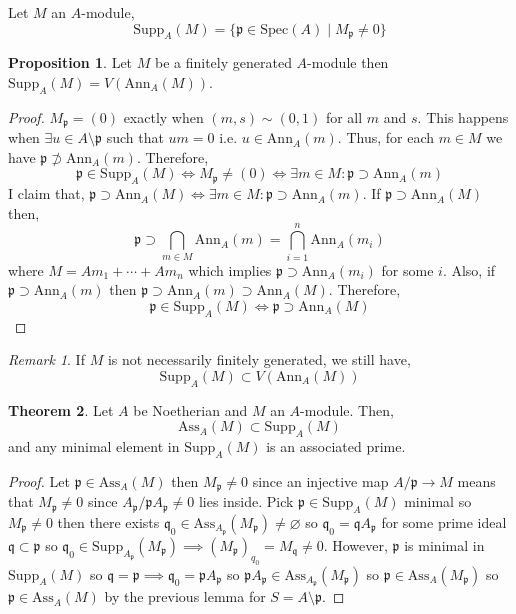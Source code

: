 \documentclass[12pt]{article}
\newcommand{\Ann}[2]{\mathrm{Ann}_{#1}\left(#2\right)}
\newcommand{\Ass}[2]{\mathrm{Ass}_{#1}\left( #2 \right)}
\newcommand{\supp}[2]{\mathrm{Supp}_{#1} \left( #2 \right) }
\newcommand{\Supp}[2]{\mathrm{Supp}_{#1}\left(#2 \right)}
\newcommand{\spec}[1]{\mathrm{Spec}\left( #1 \right)}
\newcommand{\p}{\mathfrak{p}}
\newcommand{\q}{\mathfrak{q}}
\theoremstyle{remark}
\newtheorem*{remark}{Remark}
\theoremstyle{definition}
\newtheorem{theorem}{Theorem}[section]
\newtheorem{proposition}[theorem]{Proposition}
\newenvironment{definition}[1][Definition:]{\begin{trivlist}
\item[\hskip \labelsep {\bfseries #1}]}{\end{trivlist}}
\begin{document}
\begin{definition}
Let $M$ an $A$-module,
\[ \supp{A}{M} = \{ \p \in \spec{A} \mid M_{\p} \neq 0 \} \]
\end{definition}

\begin{proposition}
Let $M$ be a finitely generated $A$-module then
$\Supp{A}{M} = V(\Ann{A}{M})$.
\end{proposition}

\begin{proof}
$M_\p = (0)$ exactly when $(m, s) \sim (0, 1)$ for all $m$ and $s$. This happens when $\exists u \in A \setminus \p$ such that $um = 0$ i.e. $u \in \Ann{A}{m}$. Thus, for each $m \in M$ we have $\p \not\supset \Ann{A}{m}$. Therefore, 
\[ \p \in \Supp{A}{M} \iff M_\p \neq (0) \iff \exists m \in M : \p \supset \Ann{A}{m} \]
I claim that, $\p \supset \Ann{A}{M} \iff \exists m \in M : \p \supset \Ann{A}{m}$. If $\p \supset \Ann{A}{M}$ then, 
\[ \p \supset \bigcap_{m \in M} \Ann{A}{m} = \bigcap_{i = 1}^n \Ann{A}{m_i} \]
where $M = A m_1 + \cdots + A m_n$ which implies $\p \supset \Ann{A}{m_i}$ for some $i$. Also, if $\p \supset \Ann{A}{m}$ then $\p \supset \Ann{A}{m} \supset \Ann{A}{M}$. Therefore,
\[ \p \in \Supp{A}{M} \iff \p \supset \Ann{A}{M} \]
\end{proof}

\begin{remark}
If $M$ is not necessarily finitely generated, we still have,
\[ \Supp{A}{M} \subset V(\Ann{A}{M}) \]
\end{remark}

\begin{theorem}
Let $A$ be Noetherian and $M$ an $A$-module. Then,
\[ \Ass{A}{M} \subset \supp{A}{M} \]
and any minimal element in $\supp{A}{M}$ is an associated prime. 
\end{theorem}


\begin{proof}
Let $\p \in \Ass{A}{M}$ then $M_{\p} \neq 0$ since an injective map $A /\p \to M$ means that $M_{\p} \neq 0$ since $A_{\p} / \p A_{\p} \neq 0$ lies inside.  Pick $\p \in \supp{A}{M}$ minimal so $M_{\p} \neq 0$ then there exists $\q_0 \in \Ass{A_{\p}}{M_{\p}} \neq \varnothing$ so $\q_0 = \q A_{\p}$ for some prime ideal $\q \subset \p$ so $\q_0 \in \Supp{A_{\p}}{M_{\p}} \implies (M_{\p})_{q_0} = M_{\q} \neq 0$. However, $\p$ is minimal in $\Supp{A}{M}$ so $\q = \p \implies \q_0 = \p A_{\p}$ so $\p A_{\p} \in \Ass{A_{\p}}{M_{\p}}$ so $\p \in \Ass{A}{M_{\p}}$ so $\p \in \Ass{A}{M}$ by the previous lemma for $S = A \setminus \p$. 
\end{proof}
\end{document}
